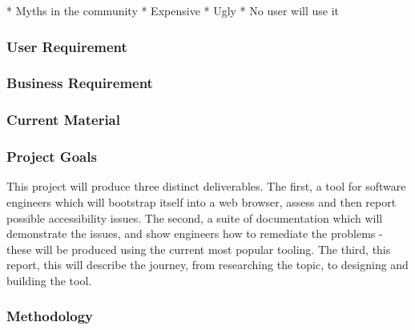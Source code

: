 * Myths in the community
  * Expensive
  * Ugly
  * No user will use it

\subsubsection{User Requirement}

\subsubsection{Business Requirement}

\subsubsection{Current Material}

\subsubsection{Project Goals}
This project will produce three distinct deliverables. The first, a tool for software engineers which will bootstrap itself into a web
browser, assess and then report possible accessibility issues. The second, a suite of documentation which will demonstrate the issues, and
show engineers how to remediate the problems - these will be produced using the current most popular tooling. The third, this report,
this will describe the journey, from researching the topic, to designing and building the tool.

\subsubsection{Methodology}
